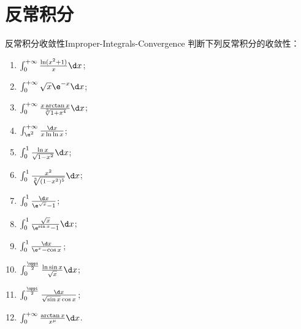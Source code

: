 \section{反常积分}

\begin{problem}{反常积分收敛性}{Improper-Integrals-Convergence}
    判断下列反常积分的收敛性：
    \begin{enumerate}
        \item $\int_0^{+\infty} \frac{\ln(x^2 + 1)}{x} \d x$;
        \item $\int_0^{+\infty} \sqrt{x} \e^{-x} \d x$;
        \item $\int_0^{+\infty} \frac{x \arctan x}{\sqrt[3]{1 + x^4}} \d x$;
        \item $\int_{\e^2}^{+\infty} \frac{\d x}{x \ln \ln x}$;
        \item $\int_0^1 \frac{\ln x}{\sqrt{1 - x^2}} \d x$;
        \item $\int_0^1 \frac{x^2}{\sqrt[3]{(1 - x^2)^5}} \d x$;
        \item $\int_0^1 \frac{\d x}{\e^{\sqrt{x}} - 1}$;
        \item $\int_0^1 \frac{\sqrt{x}}{\e^{\sin x} - 1} \d x$;
        \item $\int_0^1 \frac{\d x}{\e^x - \cos x}$;
        \item $\int_0^{\frac{\uppi}{2}} \frac{\ln \sin x}{\sqrt{x}} \d x$;
        \item $\int_0^{\frac{\uppi}{2}} \frac{\d x}{\sqrt{\sin x} \cos x}$;
        \item $\int_0^{+\infty} \frac{\arctan x}{x^{\mu}} \d x$.
    \end{enumerate}
\end{problem}

